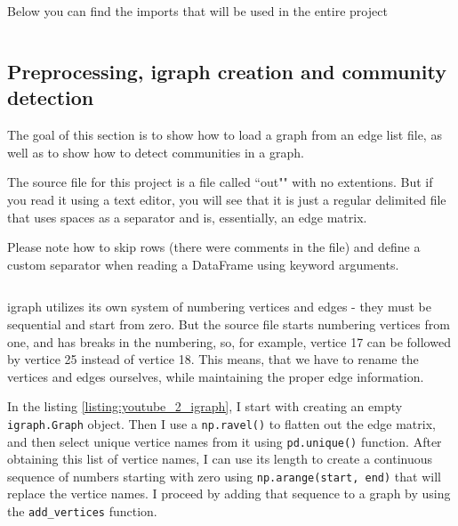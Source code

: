 \documentclass[12pt, a4paper]{article}
\begin{document}
Below you can find the imports that will be used in the entire project

\bgroup
  \inputminted[linenos, breaklines=true, fontsize=\scriptsize]{python}{src/youtube/0_imports.py}
  \label{listing:youtube_0_imports}
\egroup

\newpage
\subsection{Preprocessing, igraph creation and community detection}

The goal of this section is to show how to load a graph from an edge list file, as well as to show how to detect communities in a graph.


The source file for this project is a file called ``out"" with no extentions. But if you read it using a text editor, you will see that it is just a regular delimited file that uses spaces as a separator and is, essentially, an edge matrix.

Please note how to skip rows (there were comments in the file) and define a custom separator when reading a DataFrame using keyword arguments.

\bgroup
  \inputminted[linenos, breaklines=true, fontsize=\scriptsize]{python}{src/youtube/igraph_creation/1_pandas.py}
  \label{listing:youtube_1_pandas}
\egroup


igraph utilizes its own system of numbering vertices and edges - they must be sequential and start from zero. But the source file starts numbering vertices from one, and has breaks in the numbering, so, for example, vertice 17 can be followed by vertice 25 instead of vertice 18. This means, that we have to rename the vertices and edges ourselves, while maintaining the proper edge information.

In the listing \ref{listing:youtube_2_igraph}, I start with creating an empty \texttt{igraph.Graph} object. Then I use a \texttt{np.ravel()} to flatten out the edge matrix, and then select unique vertice names from it using \texttt{pd.unique()} function. After obtaining this list of vertice names, I can use its length to create a continuous sequence of numbers starting with zero using \texttt{np.arange(start, end)} that will replace the vertice names. I proceed by adding that sequence to a graph by using the \texttt{add\_vertices} function.
\end{document}
